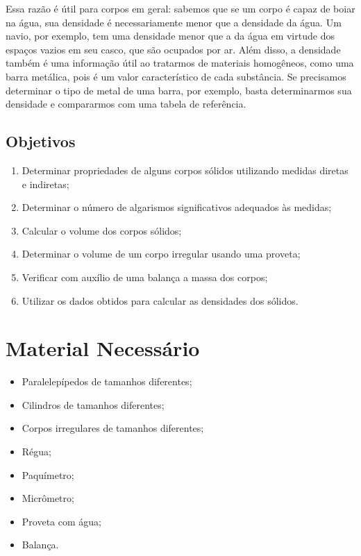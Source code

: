 Essa razão é útil para corpos em geral: sabemos que se um corpo é capaz de boiar na água, sua densidade é necessariamente menor que a densidade da água. Um navio, por exemplo, tem uma densidade menor que a da água em virtude dos espaços vazios em seu casco, que são ocupados por ar. Além disso, a densidade também é uma informação útil ao tratarmos de materiais homogêneos, como uma barra metálica, pois é um valor característico de cada substância. Se precisamos determinar o tipo de metal de uma barra, por exemplo, basta determinarmos sua densidade e compararmos com uma tabela de referência.

\subsection{Objetivos}

\begin{enumerate}
     \item Determinar propriedades de alguns corpos sólidos utilizando medidas diretas e indiretas;
     \item Determinar o número de algarismos significativos adequados às medidas;
     \item Calcular o volume dos corpos sólidos;
     \item Determinar o volume de um corpo irregular usando uma proveta;
     \item Verificar com auxílio de uma balança a massa dos corpos;
     \item Utilizar os dados obtidos para calcular as densidades dos sólidos.
\end{enumerate}

\section{Material Necessário}

\begin{itemize}
	\item Paralelepípedos de tamanhos diferentes;
	\item Cilindros de tamanhos diferentes;
	\item Corpos irregulares de tamanhos diferentes;
	\item Régua;
	\item Paquímetro;
	\item Micrômetro;
	\item Proveta com água;
	\item Balança.
\end{itemize}

